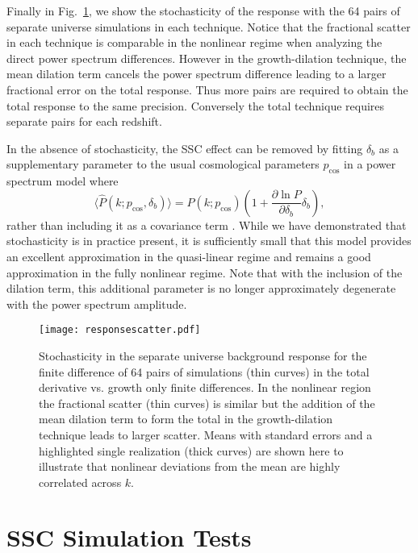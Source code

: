 \documentclass[prd,twocolumn,amsmath,amssymb,floatfix,superscriptaddress]{revtex4-1}
\begin{document}
Finally in Fig.~\ref{fig:dPdd_scatter}, we show the stochasticity of the response  with
the 64 pairs of separate universe simulations in each technique.     Notice that the fractional
scatter in each technique is comparable in the nonlinear regime when analyzing the direct power spectrum
differences.   However in the growth-dilation technique, the mean dilation term cancels
the power spectrum difference leading to a larger fractional error on the total response.
Thus more pairs are required to obtain the total response to the same precision.  Conversely
the total technique requires separate pairs for each redshift.  


In the absence of stochasticity, the SSC effect can be 
removed by fitting $\delta_b$ as a supplementary parameter to the usual cosmological
parameters $p_\text{cos}$ in a power spectrum model where
\begin{equation}
\langle \hat P(k;p_\text{cos},\delta_b)\rangle = P(k;p_\text{cos}) \left(1 + \frac{\partial \ln P}{\partial \delta_b} \delta_b \right),
\end{equation}
rather than including it as a covariance term \cite{Takada:2013wfa}.  While we have demonstrated that stochasticity is in practice present, it is sufficiently small that this model provides an excellent approximation in
the quasi-linear regime and remains a good approximation in the fully nonlinear regime.  Note that with the inclusion of the dilation term, this additional parameter is no longer
approximately degenerate with the power spectrum amplitude.




\begin{figure}[t]
    \centering
    \texttt{[image: responsescatter.pdf]}
    \caption{\footnotesize {Stochasticity in the separate universe background response for the finite difference of 64 pairs of simulations (thin curves) in the total derivative vs. growth only finite differences.    In the nonlinear region the fractional scatter (thin curves) is similar but the addition of the mean dilation term to form the total in the growth-dilation technique leads to larger scatter.  Means with standard errors and a highlighted single realization (thick curves) are shown here to illustrate that nonlinear deviations from the mean are highly correlated across $k$.}}
    \label{fig:dPdd_scatter}
\end{figure}




\section{SSC Simulation Tests}
\label{sec:sscsim}
\end{document}
